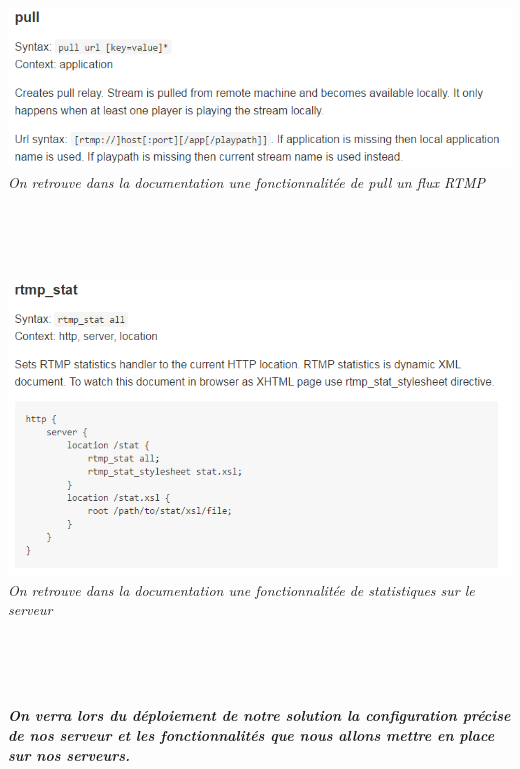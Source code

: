 \documentclass{report}
\begin{document}
    \begin{center}
    \includegraphics[width=16cm]{img/nginx1.PNG}
    \textit{\small{On retrouve dans la documentation une fonctionnalitée de pull un flux RTMP}}
    \end{center}

    \\
    \hfill{\\\\}
    
    \begin{center}
    \includegraphics[width=16cm]{img/nginx2.PNG}
    \textit{\small{On retrouve dans la documentation une fonctionnalitée de statistiques sur le serveur}}
    \end{center}

    \\
    \hfill{\\\\}

    \begin{center}
    \textbf{\textit{ On verra lors du déploiement de notre solution la configuration précise de nos serveur et les fonctionnalités que nous allons mettre en place sur nos serveurs.}}
    \end{center}

    \hfill{\\\\}
\end{document}
